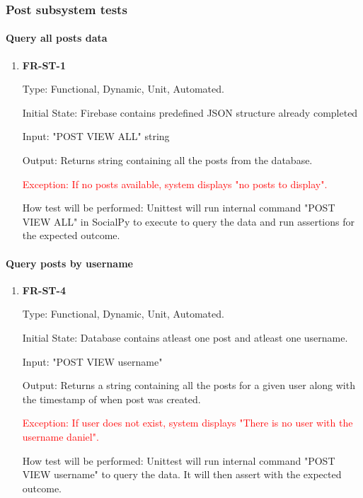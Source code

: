 \documentclass[12pt, titlepage]{article}
\begin{document}
\subsubsection{Post subsystem tests}
		
\paragraph{Query all posts data}

\begin{enumerate}

\item{\textbf{FR-ST-1}}

Type: Functional, Dynamic, Unit, Automated.
					
Initial State: Firebase contains predefined JSON structure already completed
					
Input: "POST VIEW ALL" string
					
Output: Returns string containing all the posts from the database.

\textcolor{red}{Exception: If no posts available, system displays "no posts to display".}
					
How test will be performed: Unittest will run internal command "POST VIEW ALL" in SocialPy to execute to query the data and run assertions for the expected outcome.
\end{enumerate}

\paragraph{Query posts by username}	
\begin{enumerate}
\item{\textbf{FR-ST-4}}

Type: Functional, Dynamic, Unit, Automated.
					
Initial State: Database contains atleast one post and atleast one username.
					
Input: "POST VIEW username"
					
Output: Returns a string containing all the posts for a given user along with the timestamp of when post was created.

\textcolor{red}{Exception: If user does not exist, system displays "There is no user with the username daniel".}
					
How test will be performed: Unittest will run internal command "POST VIEW username" to query the data. It will then assert with the expected outcome.
\end{enumerate}
\end{document}
